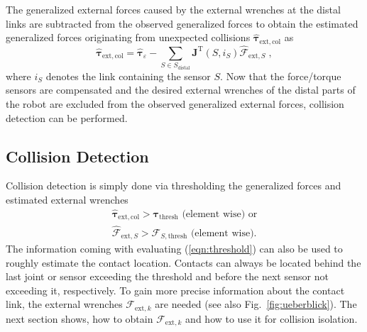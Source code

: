 %
The generalized external forces caused by the external wrenches at the distal links are subtracted from the observed generalized forces to obtain the estimated generalized forces originating from unexpected collisions $\hat{\bm{\tau}}_\mathrm{ext,col}$ as
%
\begin{equation}
\hat{\bm{\tau}}_\mathrm{ext,col}=\hat{\bm{\tau}}_\varepsilon-\sum_ {S\in S_\mathrm{distal}}\bm{J}^\mathrm{T}(S,i_S)\hat{\bm{\mathcal{F}}}_{\mathrm{ext},S}\;,\label{eqn:obs_cmp}
\end{equation}
%
where $i_S$ denotes the link containing the sensor $S$.
Now that the force/torque sensors are compensated and the desired external wrenches of the distal parts of the robot are excluded from the observed generalized external forces, collision detection can be performed.

\subsection{Collision Detection}


Collision detection is simply done via thresholding the generalized forces and estimated external wrenches
%
\begin{equation}
\begin{split}
\hat{\bm{\tau}}_\mathrm{ext,col}>\bm{\tau}_\mathrm{thresh} \text{ (element wise) or}\\
\hat{\bm{\mathcal{F}}}_{\mathrm{ext},S}>\bm{\mathcal{F}}_{S,\mathrm{thresh}} \text{ (element wise).}
\label{eqn:threshold}
\end{split}
\end{equation}
%
The information coming with evaluating (\ref{eqn:threshold}) can also be used to roughly estimate the contact location.
Contacts can always be located behind the last joint or sensor exceeding the threshold and before the next sensor not exceeding it, respectively.
To gain more precise information about the contact link, the external wrenches $\bm{\mathcal{F}}_{\mathrm{ext},k}$ are needed (see also Fig.~\ref{fig:ueberblick}).
The next section shows, how to obtain $\bm{\mathcal{F}}_{\mathrm{ext},k}$ and how to use it for collision isolation.


